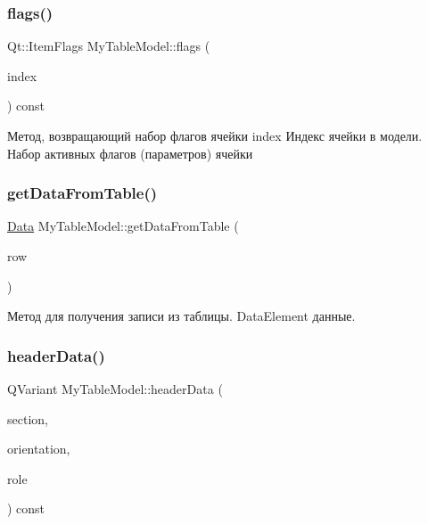 \subsubsection{\texorpdfstring{flags()}{flags()}}
{\footnotesize\ttfamily Qt\+::\+Item\+Flags My\+Table\+Model\+::flags (\begin{DoxyParamCaption}\item[{const Q\+Model\+Index \&}]{index }\end{DoxyParamCaption}) const\hspace{0.3cm}{\ttfamily [override]}}

Метод, возвращающий набор флагов ячейки index Индекс ячейки в модели. Набор активных флагов (параметров) ячейки \mbox{\label{class_my_table_model_abf64dd06923af11bcd4bdc6d759402ce}} 
\subsubsection{\texorpdfstring{getDataFromTable()}{getDataFromTable()}}
{\footnotesize\ttfamily \mbox{\hyperlink{class_data}{Data}} My\+Table\+Model\+::get\+Data\+From\+Table (\begin{DoxyParamCaption}\item[{int}]{row }\end{DoxyParamCaption})}

Метод для получения записи из таблицы. Data\+Element данные. \mbox{\label{class_my_table_model_a2a78f29e1befdcab173d458d1f6ff6e1}} 
\subsubsection{\texorpdfstring{headerData()}{headerData()}}
{\footnotesize\ttfamily Q\+Variant My\+Table\+Model\+::header\+Data (\begin{DoxyParamCaption}\item[{int}]{section,  }\item[{Qt\+::\+Orientation}]{orientation,  }\item[{int}]{role }\end{DoxyParamCaption}) const\hspace{0.3cm}{\ttfamily [override]}}

